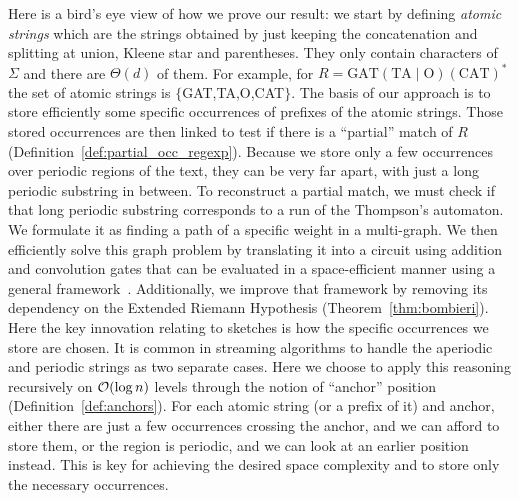 Here is a bird's eye view of how we prove our result: we start by defining \emph{atomic strings} which are the strings obtained by just keeping the concatenation and splitting at union, Kleene star and parentheses. They only contain characters of $\Sigma$ and there are $\Theta(d)$ of them. For example, for $R= \mathrm{GAT}(\mathrm{TA}\mid \mathrm{O})(\mathrm{CAT})^*$  the set of atomic strings is $\{$GAT,TA,O,CAT$\}$.
%
The basis of our approach is to store efficiently some specific occurrences of prefixes of the atomic strings. Those stored occurrences are then linked to test if there is a “partial” match of $R$ (Definition~\ref*{def:partial_occ_regexp}). Because we store only a few occurrences over periodic regions of the text, they can be very far apart, with just a long periodic substring in between. To reconstruct a partial match, we must check if that long periodic substring corresponds to a run of the Thompson's automaton. We formulate it as finding a path of a specific weight in a multi-graph. We then efficiently solve this graph problem by translating it into a circuit using addition and convolution gates that can be evaluated in a space-efficient manner using a general framework~\cite{LokshtanovN10,Bringmann17}. Additionally, we improve that framework by removing its dependency on the Extended Riemann Hypothesis (Theorem~\ref{thm:bombieri}). 
Here the key innovation relating to sketches is how the specific occurrences we store are chosen. It is common in streaming algorithms to handle the aperiodic and periodic strings as two separate cases.
Here we choose to apply this reasoning recursively on $\mathcal{O}(\log n)$ levels through the notion of ``anchor'' position (Definition~\ref{def:anchors}). For each atomic string (or a prefix of it) and anchor, either there are just a few occurrences crossing the anchor, and we can afford to store them, or the region is periodic, and we can look at an earlier position instead. This is key for achieving the desired space complexity and to store only the necessary occurrences.








